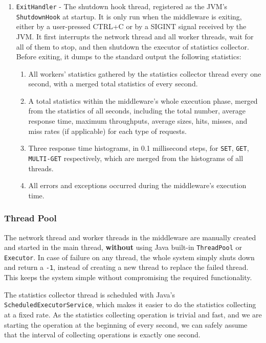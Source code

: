 \begin{enumerate}[noitemsep,topsep=0pt]
\item \texttt{ExitHandler} - The shutdown hook thread, registered as the JVM's \texttt{ShutdownHook} at startup. It is only run when the middleware is exiting, either by a user-pressed CTRL+C or by a SIGINT signal received by the JVM. It first interrupts the network thread and all worker threads, wait for all of them to stop, and then shutdown the executor of statistics collector. Before exiting, it dumps to the standard output the following statistics:

\begin{enumerate}[noitemsep,topsep=0pt]
\item All workers' statistics gathered by the statistics collector thread every one second, with a merged total statistics of every second.
\item A total statistics within the middleware's whole execution phase, merged from the statistics of all seconds, including the total number, average response time, maximum throughputs, average sizes, hits, misses, and miss rates (if applicable) for each type of requests.
\item Three response time histograms, in 0.1 millisecond steps, for \texttt{SET}, \texttt{GET}, \texttt{MULTI-GET} respectively, which are merged from the histograms of all threads.
\item All errors and exceptions occurred during the middleware's execution time.
\end{enumerate}

\end{enumerate}

\subsubsection{Thread Pool}

The network thread and worker threads in the middleware are manually created and started in the main thread, \textbf{without} using Java built-in \texttt{ThreadPool} or \texttt{Executor}. In case of failure on any thread, the whole system simply shuts down and return a \texttt{-1}, instead of creating a new thread to replace the failed thread. This keeps the system simple without compromising the required functionality.

The statistics collector thread is scheduled with Java's \texttt{ScheduledExecutorService}, which makes it easier to do the statistics collecting at a fixed rate. As the statistics collecting operation is trivial and fast, and we are starting the operation at the beginning of every second, we can safely assume that the interval of collecting operations is exactly one second.

